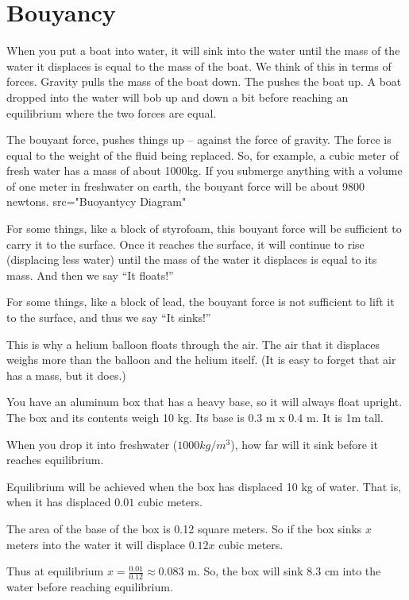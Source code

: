 \chapter{Bouyancy}

When you put a boat into water, it will sink into the water until
the mass of the water it displaces is equal to the mass of the
boat. We think of this in terms of forces. Gravity pulls the mass of
the boat down. The  pushes the boat up. A boat
dropped into the water will bob up and down a bit before reaching an
equilibrium where the two forces are equal.

The bouyant force, pushes things up -- against the force of
gravity. The force is equal to the weight of the fluid being
replaced. So, for example, a cubic meter of fresh water has a mass of
about 1000kg.  If you submerge anything with a volume of one meter in
freshwater on earth, the bouyant force will be about 9800 newtons.
\img src="Buoyantycy Diagram" 


For some things, like a block of styrofoam, this bouyant force will be
sufficient to carry it to the surface. Once it reaches the surface, it
will continue to rise (displacing less water) until the mass of the
water it displaces is equal to its mass. And then we say ``It floats!''

For some things, like a block of lead, the bouyant force is not
 sufficient to lift it to the surface, and thus we say ``It sinks!''

This is why a helium balloon floats through the air. The air
that it displaces weighs more than the balloon and the helium itself. (It is easy to forget that air has a mass, but it does.)

\begin{Exercise}[title={Bouyancy}, label=bouyancy]
  You have an aluminum box that has a heavy base, so it will always
  float upright. The box and its contents weigh 10 kg. Its base is 0.3 m x 0.4 m. It is 1m tall.

  When you drop it into freshwater ($1000 kg/m^3$), how far will it sink
  before it reaches equilibrium.
  
\end{Exercise}
\begin{Answer}[ref=bouyancy]
  Equilibrium will be achieved when the box has displaced 10 kg of water. That is, when it has displaced $0.01$ cubic meters.

  The area of the base of the box is 0.12 square meters.  So if the
  box sinks $x$ meters into the water it will displace $0.12 x$ cubic
  meters.

  Thus at equilibrium $x = \frac{0.01}{0.12} \approx 0.083$ m.  So,
  the box will sink 8.3 cm into the water before reaching equilibrium.
\end{Answer}

